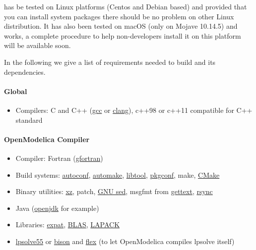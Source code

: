 \documentclass[a4paper, 12pt]{report}
\begin{document}
\Dynawo has be tested on Linux platforms (Centos and Debian based) and provided that you can install system packages there should be no problem on other Linux distribution. It has also been tested on macOS (only on Mojave 10.14.5) and works, a complete procedure to help non-developers install it on this platform will be available soon.

In the following we give a list of requirements needed to build \Dynawo and its dependencies.

\paragraph{Global}

\begin{itemize}
\item Compilers: C and C++ (\href{https://www.gnu.org/software/gcc}{gcc} or \href{https://clang.llvm.org}{clang}), c++98 or c++11 compatible for C++ standard
\end{itemize}

\paragraph{OpenModelica Compiler}

\begin{itemize}
\item
  Compiler: Fortran (\href{https://gcc.gnu.org/fortran/}{gfortran})
\item
  Build systems:
  \href{https://www.gnu.org/software/autoconf/}{autoconf},
  \href{https://www.gnu.org/software/autoconf/}{automake},
  \href{https://www.gnu.org/software/libtool/}{libtool},
  \href{http://pkgconf.org/}{pkgconf}, make,
  \href{https://cmake.org/}{CMake}
\item
  Binary utilities: \href{https://tukaani.org/xz/}{xz}, patch,
  \href{https://www.gnu.org/software/sed/}{GNU sed}, msgfmt from
  \href{https://www.gnu.org/software/gettext/}{gettext},
  \href{https://rsync.samba.org/}{rsync}
\item
  Java (\href{https://openjdk.java.net/}{openjdk} for example)
\item
  Libraries: \href{https://libexpat.github.io/}{expat},
  \href{http://www.netlib.org/blas/index.html}{BLAS},
  \href{http://www.netlib.org/lapack/index.html}{LAPACK}
\item
  \href{http://lpsolve.sourceforge.net/}{lpsolve55} or
  \href{https://www.gnu.org/software/bison/}{bison} and
  \href{https://www.gnu.org/software/flex/}{flex} (to let OpenModelica
  compiles lpsolve itself)
\end{itemize}
\end{document}
